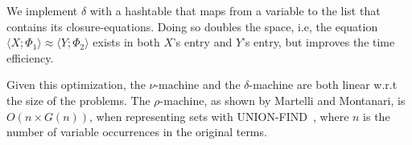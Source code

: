 \documentclass[a4paper,UKenglish]{lipics-v2016}
\newcommand{\clos}[2] {
  \langle #1; #2 \rangle
}
\newcommand{\aeq}[4] {
  \clos{#1}{#2} \approx \clos{#3}{#4}
}
\begin{document}
    We implement $\delta$ with a hashtable that maps from a variable
    to the list that contains its closure-equations.
    Doing so doubles the space, i.e, the equation $\aeq{X}{\Phi_1}{Y}{\Phi_2}$ exists in
    both $X$'s entry and $Y$'s entry, but improves the time efficiency.

    Given this optimization, the $\nu$-machine and the $\delta$-machine
    are both linear w.r.t the size of the problems.
    The $\rho$-machine, as shown by Martelli and Montanari, is $O(n \times G(n))$,
    when representing sets with UNION-FIND~\cite{tarjan_efficiency_1975},
    where $n$ is the number of variable occurrences in the original terms.

    \clearpage


\end{document}
